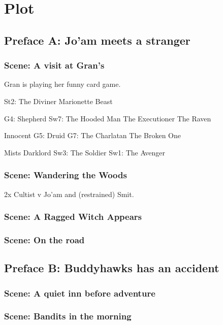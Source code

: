 \documentclass{report}
\begin{document}
  \chapter{Plot}\label{ch:plot}

  \section{Preface A: Jo'am meets a stranger}\label{sec:prefaceA:Jo'amMeetsAStranger}

  \subsection{Scene: A visit at Gran's}\label{subsec:scene:AVisitAtGran's}
  Gran is playing her funny card game.

  St2: The Diviner
  Marionette
  Beast

  G4: Shepherd
  Sw7: The Hooded Man
  The Executioner
  The Raven

  Innocent
  G5: Druid
  G7: The Charlatan
  The Broken One

  Mists
  Darklord
  Sw3: The Soldier
  Sw1: The Avenger



  \subsection{Scene: Wandering the Woods}\label{subsec:scene:WanderingTheWoods}
  2x Cultist v Jo'am and (restrained) Smit.

  \subsection{Scene: A Ragged Witch Appears}\label{subsec:scene:ARaggedWitchAppears}
  \subsection{Scene: On the road}\label{subsec:scene:OnTheRoad}

  \section{Preface B: Buddyhawks has an accident}\label{sec:prefaceB:BuddyhawksHasAnAccident}
  \subsection{Scene: A quiet inn before adventure}
  \subsection{Scene: Bandits in the morning}
\end{document}
